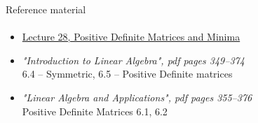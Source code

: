 \documentclass[aspectratio=169]{beamer}
\newcommand{\fbckg}[1]{\usebackgroundtemplate{\texttt{[image: \#1]}}}%
\begin{document}
\begin{frame}[t]{Reference material}
    \framesubtitle{}
    \Large
    \begin{itemize}
        \item \href{https://www.youtube.com/watch?v=vF7eyJ2g3kU&list=PL49CF3715CB9EF31D&index=28}{Lecture 28, Positive Definite Matrices and Minima}
        \item \textit{"Introduction to Linear Algebra", pdf pages 349--374 }\\  6.4 -- Symmetric, 6.5 -- Positive Definite matrices
        \item \textit{"Linear Algebra and Applications", pdf pages 355--376 }\\ Positive Definite Matrices 6.1, 6.2
    \end{itemize}
\end{frame}

\fbckg{fibeamer/figs/last_page.png}
\frame[plain]{}
\end{document}
